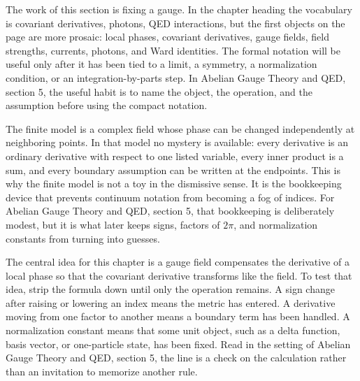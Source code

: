 











The work of this section is fixing a gauge.  In the chapter heading the vocabulary is covariant derivatives, photons, QED interactions, but the first objects on the page are more prosaic: local phases, covariant derivatives, gauge fields, field strengths, currents, photons, and Ward identities.  The formal notation will be useful only after it has been tied to a limit, a symmetry, a normalization condition, or an integration-by-parts step.  In Abelian Gauge Theory and QED, section 5, the useful habit is to name the object, the operation, and the assumption before using the compact notation.

The finite model is a complex field whose phase can be changed independently at neighboring points.  In that model no mystery is available: every derivative is an ordinary derivative with respect to one listed variable, every inner product is a sum, and every boundary assumption can be written at the endpoints.  This is why the finite model is not a toy in the dismissive sense.  It is the bookkeeping device that prevents continuum notation from becoming a fog of indices.  For Abelian Gauge Theory and QED, section 5, that bookkeeping is deliberately modest, but it is what later keeps signs, factors of \(2\pi\), and normalization constants from turning into guesses.

The central idea for this chapter is a gauge field compensates the derivative of a local phase so that the covariant derivative transforms like the field.  To test that idea, strip the formula down until only the operation remains.  A sign change after raising or lowering an index means the metric has entered.  A derivative moving from one factor to another means a boundary term has been handled.  A normalization constant means that some unit object, such as a delta function, basis vector, or one-particle state, has been fixed.  Read in the setting of Abelian Gauge Theory and QED, section 5, the line is a check on the calculation rather than an invitation to memorize another rule.

